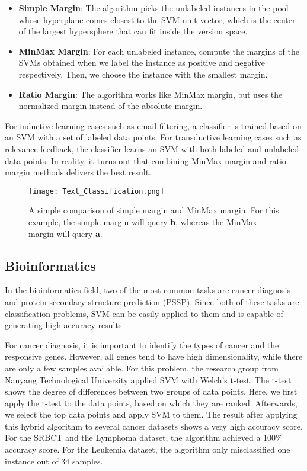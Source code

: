 \begin{itemize}
    \item \textbf{Simple Margin}: The algorithm picks the unlabeled instances
    in the pool whose hyperplane comes closest to the SVM unit vector, which is
    the center of the largest hypersphere that can fit inside the version space.
    \item \textbf{MinMax Margin}: For each unlabeled instance, compute the margins
    of the SVMs obtained when we label the instance as positive and negative
    respectively. Then, we choose the instance with the smallest margin.
    \item \textbf{Ratio Margin}: The algorithm works like MinMax margin, but uses
    the normalized margin instead of the absolute margin.
\end{itemize}

For inductive learning cases such as email filtering, a classifier is trained 
based on an SVM with a set of labeled data points. 
For transductive learning cases such as relevance feedback, the classifier
learns an SVM with both labeled and unlabeled data points. In reality, it turns
out that combining MinMax margin and ratio margin methods delivers the best
result. \cite{text-classification}
\begin{figure}[h]%
    \begin{center}%
        \texttt{[image: Text\_Classification.png]}%
        \caption{
        A simple comparison of simple margin and MinMax margin.
        For this example, the simple margin will query \textbf{b},
        whereas the MinMax margin will query \textbf{a}.
        \cite{text-classification}}\label{fig:}%
    \end{center}%
\end{figure}


\subsection*{Bioinformatics}
In the bioinformatics field, two of the most common tasks are cancer
diagnosis and protein secondary structure prediction (PSSP). Since both of these
tasks are classification problems, SVM can be easily applied to them and is
capable of generating high accuracy results.

For cancer diagnosis, it is important to identify the types of cancer and the
responsive genes. However, all genes tend to have high dimensionality, while 
there are only a few samples available. For this problem, the research group
from Nanyang Technological University applied SVM with Welch's t-test.
The t-test shows the degree of differences between two groups of data points.
Here, we first apply the t-test to the data points, based on which they are 
ranked. Afterwards, we select the top data points and apply SVM to them.
The result after applying this hybrid algorithm to several cancer datasets 
shows a very high accuracy score. For the SRBCT and the Lymphoma dataset, the
algorithm achieved a 100\% accuracy score. For the Leukemia dataset, the
algorithm only misclassified one instance out of 34 samples.


